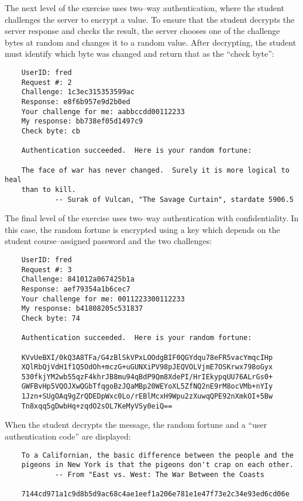 \documentclass[12pt]{article}
\begin{document}
The next level of the exercise uses two--way authentication, 
where the student challenges the server to encrypt a value. 
To ensure that the student decrypts the
server response and checks the result, the server chooses one of the
challenge bytes at random and changes it to a random value.  After decrypting,
the student must identify which byte was changed and return that as the
``check byte'':

\begin{verbatim}
    UserID: fred
    Request #: 2
    Challenge: 1c3ec315353599ac
    Response: e8f6b957e9d2b0ed
    Your challenge for me: aabbccdd00112233
    My response: bb738ef05d1497c9
    Check byte: cb

    Authentication succeeded.  Here is your random fortune:

    The face of war has never changed.  Surely it is more logical to heal
    than to kill.
            -- Surak of Vulcan, "The Savage Curtain", stardate 5906.5
\end{verbatim}

The final level of the exercise uses two--way authentication with confidentiality.
In this case, the random fortune
is encrypted using a key which depends on the student course--assigned password
and the two challenges:

\begin{verbatim}
    UserID: fred
    Request #: 3
    Challenge: 841012a067425b1a
    Response: aef79354a1b6cec7
    Your challenge for me: 0011223300112233
    My response: b41808205c531837
    Check byte: 74

    Authentication succeeded.  Here is your random fortune:

    KVvUeBXI/0kQ3A8TFa/G4zBlSkVPxLOOdgBIF0QGYdqu78eFR5vacYmqcIHp
    XQlRbQjVdH1f1Q5OdOh+mczG+uGUNXiPV98pJEQVOLVjmE7OSKrwx798oGyx
    530fkjYM2wb55qzF4khrJB8mu94qBdP9Qm8XdePI/HrIEkypqUU76ALrGs0+
    GWFBvHp5VQOJXwQGbTfqgoBzJQaMBp20WEYoXL5ZfNQ2nE9rM8ocVMb+nYIy
    1Jzn+SUgOAq9gZrQDEDpWxc0Lo/rEBlMcxH9Wpu2zXuwqQPE92nXmkOI+5Bw
    Tn8xqq5gDwbHq+zqdO2sOL7KeMyVSy0eiQ==
\end{verbatim}

When the student decrypts the message, the random
fortune and a ``user authentication code'' are displayed:

\begin{verbatim}
    To a Californian, the basic difference between the people and the
    pigeons in New York is that the pigeons don't crap on each other.
            -- From "East vs. West: The War Between the Coasts

    7144cd971a1c9d8b5d9ac68c4ae1eef1a206e781e1e47f73e2c34e93ed6cd06e
\end{verbatim}
\end{document}
